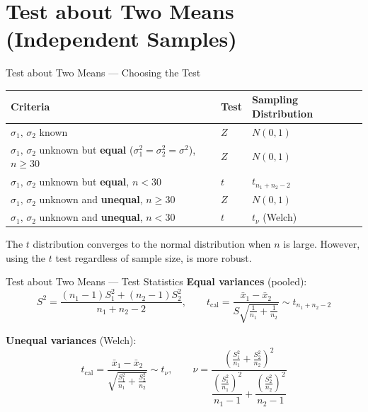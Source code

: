\documentclass[12pt, aspectratio=169]{beamer}
\begin{document}
    \section{Test about Two Means (Independent Samples)}


    \begin{frame}{Test about Two Means --- Choosing the Test}
        \begin{center}
            \small
            \begin{tabular}{p{8.5cm}lp{2.25cm}}
                \toprule
                \textbf{Criteria} & \textbf{Test} & \textbf{Sampling Distribution} \\
                \midrule
                $\sigma_1,\,\sigma_2$ known & $Z$ & $N(0,1)$ \\[0.6em]
                $\sigma_1,\,\sigma_2$ unknown but \textbf{equal} ($\sigma_1^2 = \sigma_2^2 = \sigma^2$),
                    $n \geqslant 30$ & $Z$ & $N(0,1)$ \\[0.6em]
                $\sigma_1,\,\sigma_2$ unknown but \textbf{equal},
                    $n < 30$ & $t$ & $t_{n_1+n_2-2}$ \\[0.6em]
                $\sigma_1,\,\sigma_2$ unknown and \textbf{unequal},
                    $n \geqslant 30$ & $Z$ & $N(0,1)$ \\[0.6em]
                $\sigma_1,\,\sigma_2$ unknown and \textbf{unequal},
                    $n < 30$ & $t$ & $t_{\nu}$ (Welch) \\
                \bottomrule
            \end{tabular}
        \end{center}
        The \(t\) distribution converges to the normal distribution when \(n\) is large. However, using the \(t\) test regardless of sample size, is more robust.
    \end{frame}


    \begin{frame}{Test about Two Means --- Test Statistics}
        \textbf{Equal variances} (pooled):
        \[
            S^2 = \frac{(n_1-1)S_1^2 + (n_2-1)S_2^2}{n_1+n_2-2},
            \qquad
            t_{\text{cal}} = \frac{\bar{x}_1 - \bar{x}_2}{S\sqrt{\tfrac{1}{n_1}+\tfrac{1}{n_2}}}
            \sim t_{n_1+n_2-2}
        \]

        \vspace{0.8em}

        \textbf{Unequal variances} (Welch):
        \[
            t_{\text{cal}} = \frac{\bar{x}_1 - \bar{x}_2}{\sqrt{\tfrac{S_1^2}{n_1}+\tfrac{S_2^2}{n_2}}}
            \sim t_{\nu},
            \qquad
            \nu = \frac{\left(\tfrac{S_1^2}{n_1}+\tfrac{S_2^2}{n_2}\right)^2}
                       {\dfrac{\left(\tfrac{S_1^2}{n_1}\right)^2}{n_1-1}
                        +\dfrac{\left(\tfrac{S_2^2}{n_2}\right)^2}{n_2-1}}
        \]
    \end{frame}
\end{document}
